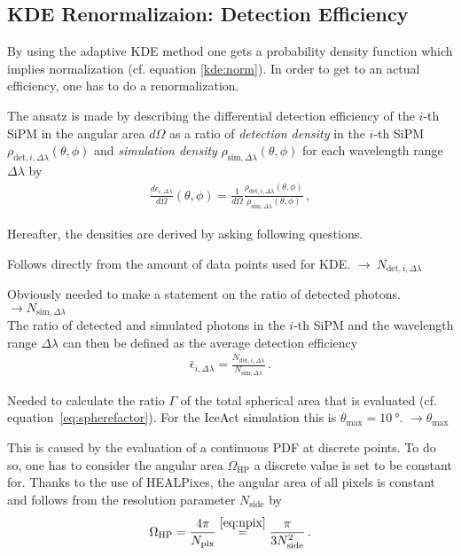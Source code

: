 \subsection{KDE Renormalizaion: Detection Efficiency}

By using the adaptive KDE method one gets a probability density function which implies normalization (cf. equation \eqref{kde:norm}). In order to get to an actual efficiency, one has to do a renormalization.

The ansatz is made by describing the differential detection efficiency of the $i$-th SiPM in the angular area $d\Omega$ as a ratio of \textit{detection density} in the $i$-th SiPM $\rho_{\text{det},i,\Delta\lambda}(\theta,\phi)$ and \textit{simulation density} $\rho_{\text{sim},\Delta\lambda}(\theta,\phi)$ for each wavelength range $\Delta\lambda$ by
\begin{align}
\frac{d\epsilon_{i,\Delta\lambda}}{d\Omega}(\theta,\phi) = \frac{1}{d\Omega} \frac{\rho_{\text{det},i,\Delta\lambda}(\theta,\phi)}{\rho_{\text{sim},\Delta\lambda}(\theta,\phi)}\,,
\end{align}

Hereafter, the densities are derived by asking following questions.

Follows directly from the amount of data points used for KDE. $\rightarrow~N_{\text{det},i,\Delta\lambda}$

Obviously needed to make a statement on the ratio of detected photons. $\rightarrow N_{\text{sim},\Delta\lambda}$\\
The ratio of detected and simulated photons in the $i$-th SiPM and the wavelength range $\Delta\lambda$ can then be defined as the average detection efficiency 
\begin{align}
	\bar{\epsilon}_{i,\Delta\lambda} = \frac{N_{\text{det},i,\Delta\lambda}}{N_{\text{sim},\Delta\lambda}}\,.
\end{align}

Needed to calculate the ratio $\Gamma$ of the total spherical area that is evaluated (cf. equation~\eqref{eq:spherefactor}). For the IceAct simulation this is $\theta_\text{max} = \SI{10}{\degree}$. $\rightarrow \theta_\text{max}$

This is caused by the evaluation of a continuous PDF at discrete points. To do so, one has to consider the angular area $\Omega_\text{HP}$ a discrete value is set to be constant for. Thanks to the use of HEALPixes, the angular area of all pixels is constant and follows from the resolution parameter $N_\text{side}$ by
\begin{align}
	\Omega_\text{HP} = \frac{4\pi}{N_\text{pix}} \overset{\eqref{eq:npix}}{=} \frac{\pi}{3N_\text{side}^2}\,.
\end{align}

